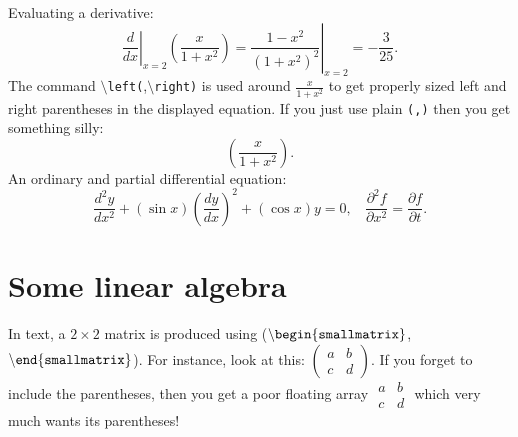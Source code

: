 \documentclass[12pt,letterpaper]{amsart}
\newcommand{\sm}{\setminus}
\newcommand{\pln}[1]{$\sm${\tt #1}}
\newcommand{\bgn}[1]{$\tt {\sm}begin\{#1\}$}
\newcommand{\nd}[1]{$\tt {\sm}end\{#1\}$}
\theoremstyle{plain}
\theoremstyle{definition}
\numberwithin{equation}{section}
\begin{document}
Evaluating a derivative:
$$
\left.\frac{d}{dx}\right|_{x=2}\left(\frac{x}{1+x^2}\right) = 
\left.\frac{1-x^2}{(1+x^2)^2}\right|_{x=2} = -\frac{3}{25}.
$$
The command \pln{left(},\pln{right)} is used around 
$\frac{x}{1+x^2}$ to get properly sized left and 
right parentheses in the displayed equation.  If you 
just use plain {\tt (,)} then you get something silly:
$$
(\frac{x}{1+x^2}).
$$
An ordinary and partial differential equation:
$$
\frac{d^2{y}}{dx^2} + (\sin x)\left(\frac{dy}{dx}\right)^2 + 
(\cos x)y = 0, 
\ \ \ \ 
\frac{\partial^2 f}{\partial x^2} = \frac{\partial f}{\partial t}.
$$

\section{Some linear algebra}\label{linalgsec}


In text, a $2 \times 2$ matrix is produced 
using (\bgn{smallmatrix},\nd{smallmatrix}).
For instance, look at this: 
$(\begin{smallmatrix}a&b\\c&d\end{smallmatrix})$. 
If you forget to include the parentheses, then you 
get a poor floating array $\begin{smallmatrix}a&b\\c&d\end{smallmatrix}$ 
which very much wants its parentheses!
\end{document}
